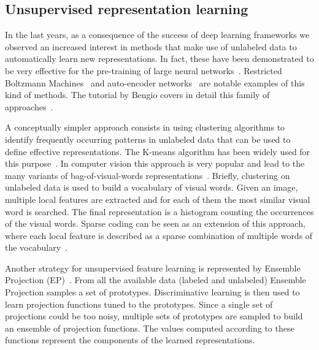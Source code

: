 \documentclass[journal,11pt]{IEEEtran}
\begin{document}
\subsection{Unsupervised representation learning}
In the last years,
as a consequence of the success of deep learning frameworks we
observed an increased interest in methods that make use of unlabeled
data to automatically learn new representations.  In fact, these have
been demonstrated to be very effective for the pre-training of large
neural networks~\cite{hinton2006fast,jarrett2009best}.  Restricted
Boltzmann Machines~\cite{hinton2002training} and auto-encoder
networks~\cite{bourlard1988autoassociation} are notable examples of
this kind of methods.  The tutorial by Bengio covers in detail this
family of approaches~\cite{bengio2009learning}.

A conceptually simpler approach consists in using clustering
algorithms to identify frequently occurring patterns in unlabeled data
that can be used to define effective representations.  The K-means
algorithm has been widely used for this
purpose~\cite{coates2012learning}.  In computer vision this approach
is very popular and lead to the many variants of bag-of-visual-words
representations~\cite{csurka2004visual,lazebnik2006beyond}.  Briefly,
clustering on unlabeled data is used to build a vocabulary of visual
words.  Given an image, multiple local features are extracted and for
each of them the most similar visual word is searched.  The final
representation is a histogram counting the occurrences of the visual
words.  Sparse coding can be seen as an extension of this approach,
where each local feature is described as a sparse combination of
multiple words of the
vocabulary~\cite{olshausen1997sparse,mairal2010online,lewicki2000learning}.

Another strategy for unsupervised feature learning is represented by
Ensemble Projection (EP)~\cite{dai2013ensemble}. From all the
available data (labeled and unlabeled) Ensemble Projection samples a
set of prototypes. Discriminative learning is then used to learn
projection functions tuned to the prototypes.
Since a single set of projections could be too noisy, multiple sets of
prototypes are sampled to build an ensemble of projection functions. The values computed according to these functions represent the
components of the learned representations.
\end{document}
